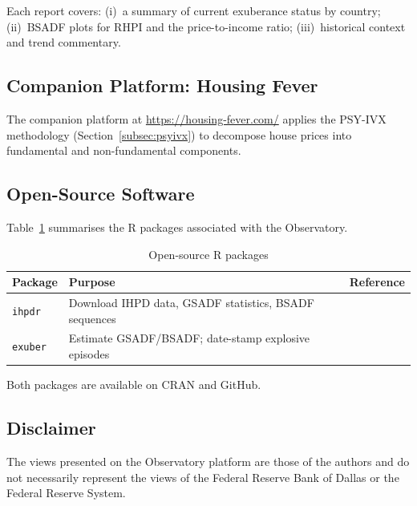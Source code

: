Each report covers: (i)~a summary of current exuberance status by country;
(ii)~BSADF plots for RHPI and the price-to-income ratio; (iii)~historical
context and trend commentary.

\subsection{Companion Platform: Housing Fever}

The companion platform at \url{https://housing-fever.com/} applies the
PSY-IVX methodology (Section~\ref{subsec:psyivx}) to decompose house prices
into fundamental and non-fundamental components.

\subsection{Open-Source Software}

Table~\ref{tab:software} summarises the \textsf{R} packages associated with
the Observatory.

\begin{table}[ht]
  \centering
  \caption{Open-source \textsf{R} packages}
  \label{tab:software}
  \begin{tabular}{lll}
    \toprule
    Package & Purpose & Reference \\
    \midrule
    \texttt{ihpdr}  & Download IHPD data, GSADF statistics, BSADF sequences
                    & \citet{ihpdr} \\
    \texttt{exuber} & Estimate GSADF/BSADF; date-stamp explosive episodes
                    & \citet{exuber} \\
    \bottomrule
  \end{tabular}
\end{table}

Both packages are available on CRAN and GitHub.

\subsection{Disclaimer}

The views presented on the Observatory platform are those of the authors and
do not necessarily represent the views of the Federal Reserve Bank of Dallas
or the Federal Reserve System.

